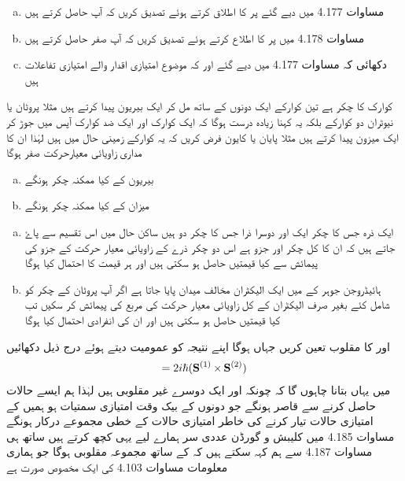 \begin{enumerate}[a.]
\item
مساوات 4.177 میں دیے گئے  پر  کا اطلاق کرتے ہوئے تصدیق کریں کہ آپ  حاصل کرتے ہیں 
\item
مساوات 4.178 میں  پر  کا اطلاع کرتے ہوئے تصدیق کریں کہ آپ صفر حاصل کرتے ہیں 
\item
دکھائی کہ مساوات 4.177 میں دیے گئے  اور   کہ موضوع امتیازی اقدار والے امتیازی تفاعلات ہیں 
\end{enumerate}
کوارک کا چکر  ہے تین کوارکے ایک دونوں کے ساتھ مل کر ایک بیریون پیدا کرتے ہیں مثلا پروٹان یا نیوٹران دو کوارکے بلکہ یہ کہنا زیادہ درست ہوگا کہ ایک کوارک اور ایک ضد کوارک آپس میں جوڑ کر ایک میزون  پیدا کرتے ہیں مثلا پایان یا کایون فرض کریں کہ یہ کوارکے زمینی حال میں ہیں لہٰذا ان کا مداری زاویائی معیارحرکت صفر ہوگا 
\begin{enumerate}[a.]
\item
بیریون  کے کیا ممکنہ چکر ہونگے 
\item
میزان کے کیا ممکنہ چکر ہونگے 
\end{enumerate}
\begin{enumerate}[a.]
\item
ایک ذرہ جس کا چکر ایک اور دوسرا ذرا جس کا چکر دو ہیں ساکن حال میں اس تقسیم سے پاۓ جاتے ہیں کہ ان کا کل چکر  اور  جزو  ہے اس دو چکر ذرے کے زاویائی معیار حرکت کے  جزو کی پیمائش سے کیا قیمتیں حاصل ہو سکتی ہیں اور ہر قیمت کا احتمال کیا ہوگا 
\item
ہائیڈروجن جوہر کے  میں ایک الیکٹران مخالف میدان پایا جاتا ہے اگر آپ پروٹان کے چکر کو شامل کئے بغیر صرف الیکٹران کے کل زاویائی معیار حرکت کی مربع کی پیمائش کر سکیں تب کیا قیمتیں حاصل ہو سکتی ہیں اور ان کی انفرادی احتمال کیا ہوگا 
\end{enumerate}
 اور  کا مقلوب تعین کریں جہاں  ہوگا اپنے نتیجہ کو عمومیت دیتے ہوئے درج ذیل دکھائیں 
\begin{align} 
[S^2 , \mat{S}^{(1)}] = 2 i \hslash (\mat{S}^{(1)} \times \mat{S}^{(2)})
\end{align}
میں یہاں بتانا چاہوں گا کہ چونکہ  اور  ایک دوسرے غیر مقلوبی ہیں لہٰذا ہم ایسے حالات حاصل کرنے سے قاصر ہونگے جو دونوں کے بیک وقت امتیازی سمتيات ہو ہمیں  کے امتیازی حالات تیار کرنے کی خاطر  امتیازی حالات کے خطی مجموعے درکار ہونگے مساوات 4.185 ميں كليبش و گورڈن عددی سر ہمارے لیے یہی کچھ کرتے ہیں ساتھ ہی مساوات 4.187 سے ہم کہہ سکتے ہیں کہ  کے ساتھ مجموعہ  مقلوبی  ہوگا جو ہماری معلومات مساوات 4.103 کی ایک مخصوص صورت ہے 

